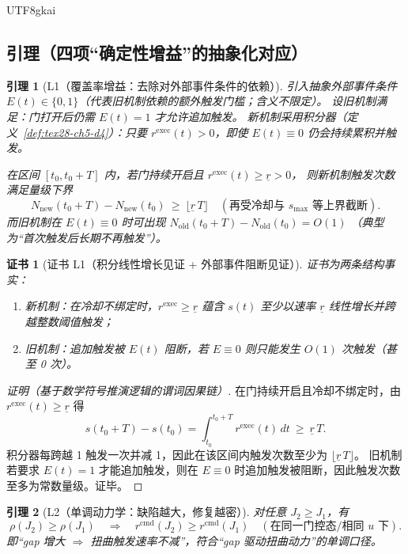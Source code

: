 \documentclass[12pt]{article}
\newtheorem{lemma}{引理}[section]
\newtheorem{Certificate}{证书}[section]
\begin{document}
\begin{CJK*}{UTF8}{gkai}
\subsection{引理（四项“确定性增益”的抽象化对应）}
\label{subsec:tex28-ch5-lemmas}

\begin{lemma}[L1（覆盖率增益：去除对外部事件条件的依赖）]
\label{lem:tex28-ch5-l1}
引入抽象外部事件条件 $E(t)\in\{0,1\}$（代表旧机制依赖的额外触发门槛；含义不限定）。
设旧机制满足：门打开后仍需 $E(t)=1$ 才允许追加触发。
新机制采用积分器（定义~\ref{def:tex28-ch5-d4}）：只要 $r^{\mathrm{exec}}(t)>0$，即使 $E(t)\equiv 0$ 仍会持续累积并触发。

在区间 $[t_0,t_0+T]$ 内，若门持续开启且 $r^{\mathrm{exec}}(t)\ge \underline r>0$，
则新机制触发次数满足量级下界
\[
  N_{\mathrm{new}}(t_0+T)-N_{\mathrm{new}}(t_0)\ \ge\ \bigl\lfloor \underline r\,T \bigr\rfloor
  \quad(\text{再受冷却与 }s_{\max}\text{ 等上界截断}).
\]
而旧机制在 $E(t)\equiv 0$ 时可出现
$
N_{\mathrm{old}}(t_0+T)-N_{\mathrm{old}}(t_0)=O(1)
$
（典型为“首次触发后长期不再触发”）。
\end{lemma}

\begin{Certificate}[证书 L1（积分线性增长见证 + 外部事件阻断见证）]
\label{cert:tex28-ch5-l1}
证书为两条结构事实：
\begin{enumerate}
  \item 新机制：在冷却不绑定时，$r^{\mathrm{exec}}\ge\underline r$ 蕴含 $s(t)$ 至少以速率 $\underline r$ 线性增长并跨越整数阈值触发；
  \item 旧机制：追加触发被 $E(t)$ 阻断，若 $E\equiv 0$ 则只能发生 $O(1)$ 次触发（甚至 0 次）。
\end{enumerate}
\end{Certificate}

\begin{proof}[证明（基于数学符号推演逻辑的谓词因果链）]
在门持续开启且冷却不绑定时，由 $r^{\mathrm{exec}}(t)\ge\underline r$ 得
\[
  s(t_0+T)-s(t_0)=\int_{t_0}^{t_0+T} r^{\mathrm{exec}}(t)\,dt\ \ge\ \underline r\,T.
\]
积分器每跨越 1 触发一次并减 1，因此在该区间内触发次数至少为 $\lfloor \underline r\,T\rfloor$。
旧机制若要求 $E(t)=1$ 才能追加触发，则在 $E\equiv 0$ 时追加触发被阻断，因此触发次数至多为常数量级。证毕。
\end{proof}

\begin{lemma}[L2（单调动力学：缺陷越大，修复越密）]
\label{lem:tex28-ch5-l2}
对任意 $J_2\ge J_1$，有
\[
  \rho(J_2)\ge\rho(J_1)
  \quad\Rightarrow\quad
  r^{\mathrm{cmd}}(J_2)\ge r^{\mathrm{cmd}}(J_1)
  \quad(\text{在同一门控态/相同 }u\text{ 下}).
\]
即“gap 增大 $\Rightarrow$ 扭曲触发速率不减”，符合“gap 驱动扭曲动力”的单调口径。
\end{lemma}


\end{CJK*}
\end{document}
